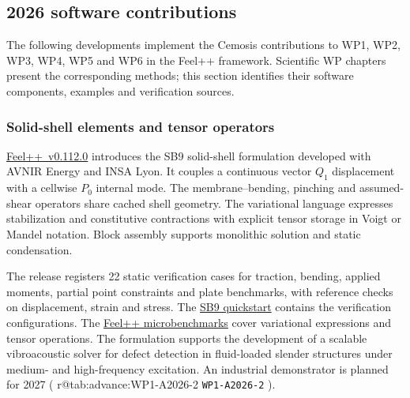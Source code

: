 \ifdefined\FeelppImplementationTwentySixRendered\else
\global\let\FeelppImplementationTwentySixRendered\relax
\newcommand{\FeelppImplementationAdvance}[1]{%
  \ifcsname r@tab:advance:#1\endcsname
    \Cref{tab:advance:#1}%
  \else
    \nolinkurl{#1}%
  \fi}

\subsection{2026 software contributions}
\label{sec:Feelpp:implementation-2026}

The following developments implement the Cemosis contributions to WP1, WP2,
WP3, WP4, WP5 and WP6 in the Feel++ framework. Scientific WP chapters
present the corresponding methods; this section identifies their software
components, examples and verification sources.

\subsubsection{Solid-shell elements and tensor operators}
\label{sec:Feelpp:implementation-2026:sb9}
\href{https://github.com/feelpp/feelpp/releases/tag/v0.112.0}{Feel++~v0.112.0}
introduces the SB9 solid-shell formulation developed with AVNIR Energy and
INSA Lyon. It couples a continuous vector $Q_1$ displacement with a cellwise
$P_0$ internal mode. The membrane--bending, pinching and assumed-shear
operators share cached shell geometry. The variational language expresses
stabilization and constitutive contractions with explicit tensor storage in
Voigt or Mandel notation. Block assembly supports monolithic solution and
static condensation.

The release registers 22 static verification cases for traction, bending,
applied moments, partial point constraints and plate benchmarks, with
reference checks on displacement, strain and stress.
The \href{https://github.com/feelpp/feelpp/tree/v0.112.0/feelpp/quickstart/elasticity/sb9}{SB9 quickstart}
contains the verification configurations. The
\href{https://github.com/feelpp/feelpp/tree/v0.112.0/benchmarks/feelpp}{Feel++ microbenchmarks}
cover variational expressions and tensor operations. The formulation supports
the development of a scalable vibroacoustic solver for defect detection in
fluid-loaded slender structures under medium- and high-frequency excitation.
An industrial demonstrator is planned for 2027
(\FeelppImplementationAdvance{WP1-A2026-2}).

